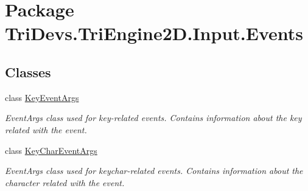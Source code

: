\hypertarget{namespace_tri_devs_1_1_tri_engine2_d_1_1_input_1_1_events}{\section{Package Tri\-Devs.\-Tri\-Engine2\-D.\-Input.\-Events}
\label{namespace_tri_devs_1_1_tri_engine2_d_1_1_input_1_1_events}
}
\subsection*{Classes}
\begin{DoxyCompactItemize}
\item 
class \hyperlink{class_tri_devs_1_1_tri_engine2_d_1_1_input_1_1_events_1_1_key_event_args}{Key\-Event\-Args}
\begin{DoxyCompactList}\small\item\em Event\-Args class used for key-\/related events. Contains information about the key related with the event. \end{DoxyCompactList}\item 
class \hyperlink{class_tri_devs_1_1_tri_engine2_d_1_1_input_1_1_events_1_1_key_char_event_args}{Key\-Char\-Event\-Args}
\begin{DoxyCompactList}\small\item\em Event\-Args class used for keychar-\/related events. Contains information about the character related with the event. \end{DoxyCompactList}\end{DoxyCompactItemize}
